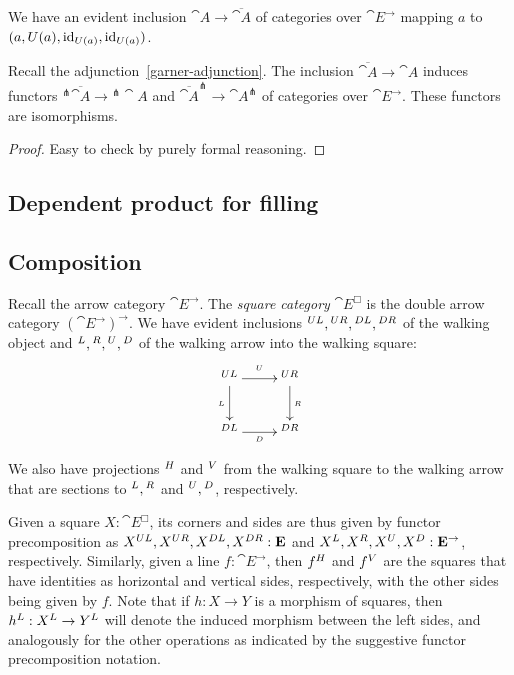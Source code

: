 \documentclass[reqno,10pt,a4paper,oneside]{amsart}
\begin{document}
We have an evident inclusion $\cat{A} \to \overline{\cat{A}}$ of categories over $\cat{E}^{\to}$ mapping $a$ to $(a, U(a), \operatorname{id}_{U(a)}, \operatorname{id}_{U(a)})$.

\begin{lemma}
\label{retract-closure}
Recall the adjunction~\eqref{garner-adjunction}.
The inclusion $\overline{\cat{A}} \to \cat{A}$ induces functors $^{\pitchfork}\overline{\cat{A}} \to{} ^{\pitchfork}\cat{A}$ and $\overline{\cat{A}}^{\pitchfork} \to \cat{A}^{\pitchfork}$ of categories over $\cat{E}^{\to}$.
These functors are isomorphisms.
\end{lemma}

\begin{proof}
Easy to check by purely formal reasoning.
\end{proof}

\subsection{Dependent product for filling}



\subsection{Composition}

Recall the arrow category $\cat{E}^{\to}$.
The \emph{square category} $\cat{E}^{\Box}$ is the double arrow category $(\cat{E}^{\to})^{\to}$.
We have evident inclusions ${}^{UL}, {}^{UR}, {}^{DL}, {}^{DR}$ of the walking object and ${}^L, {}^R, {}^U, {}^D$ of the walking arrow into the walking square:
\[
\xymatrix{
  \squl
  \ar[r]^{\squ}
  \ar[d]_{\sql}
  \ar@{}[dr]
&
  \squr
  \ar[d]^{\sqr}
\\
  \sqdl
  \ar[r]_{\sqd}
&
  \sqdr
}
\]
We also have projections ${}^{H}$ and ${}^{V}$ from the walking square to the walking arrow that are sections to ${}^L, {}^R$ and ${}^U, {}^D$, respectively.

Given a square $X : \cat{E}^{\Box}$, its corners and sides are thus given by functor precomposition as $X{}^{UL}, X{}^{UR}, X{}^{DL}, X{}^{DR} : \mathbf{E}$ and $X{}^L, X{}^R, X{}^U, X{}^D : \mathbf{E}^{\to}$, respectively.
Similarly, given a line $f : \cat{E}^{\to}$, then $f{}^{H}$ and $f{}^{V}$ are the squares that have identities as horizontal and vertical sides, respectively, with the other sides being given by $f$.
Note that if $h : X \to Y$ is a morphism of squares, then \eg $h{}^L : X{}^L \to Y{}^L$ will denote the induced morphism between the left sides, and analogously for the other operations as indicated by the suggestive functor precomposition notation.
\end{document}
